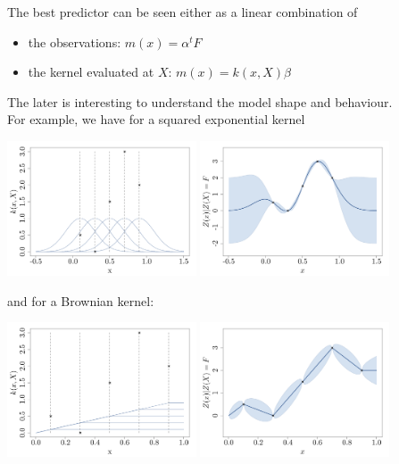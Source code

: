 \begin{frame}{}
The best predictor can be seen either as a linear combination of
\begin{itemize}
	\item the observations: $m(x)=\alpha^t F$
	\item the kernel evaluated at $X$: $m(x)=k(x,X) \beta$
\end{itemize}
The later is interesting to understand the model shape and behaviour. \\
\vspace{5mm}
For example, we have for a squared exponential kernel
\begin{center}
\includegraphics[height=4cm]{1_stat_models/figures/R/ch34_basisfuncGauss}
\includegraphics[height=4cm]{1_stat_models/figures/R/ch34_GPRbasisfuncGauss}
\end{center}
\end{frame}

\begin{frame}{}
and for a Brownian kernel:
\begin{center}
\includegraphics[height=4cm]{1_stat_models/figures/R/ch34_basisfuncBrown}
\includegraphics[height=4cm]{1_stat_models/figures/R/ch34_GPRbasisfuncBrown}
\end{center}
\end{frame}

